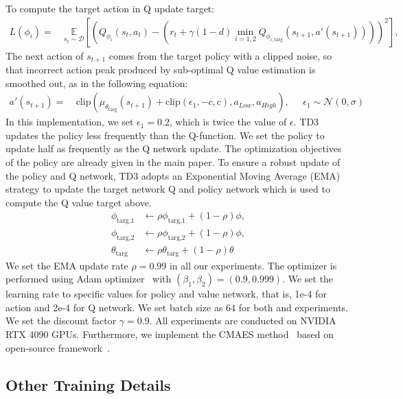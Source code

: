 To compute the target action in Q update target:
\begin{align}\label{eq:qloss1}
L(\phi_{i}) = & ~ \underset{s_t \sim {\mathcal D}}{\mathbb{E}}  \left[ \left( Q_{\phi_i}(s_t,a_t) - \left( r_t + \gamma (1-d) \min_{i=1,2} Q_{\phi_{i, \text{targ}}}(s_{t+1}, a'(s_{t+1}))  \right) \right)^2\right] ,
\end{align}
The next action of $s_{t+1}$ comes from the target policy with a clipped noise, so that incorrect action peak produced by sub-optimal Q value estimation is smoothed out, as in the following equation:
\begin{align}
a'(s_{t+1}) = &~ \text{clip}\left(\mu_{\theta_{\text{targ}}}(s_{t+1}) + \text{clip}(\epsilon_1,-c,c), a_{Low}, a_{High}\right), \;\;\;\;\; \epsilon_1 \sim \mathcal{N}(0, \sigma) 
\end{align}
In this implementation, we set $\epsilon_1 = 0.2$, which is twice the value of $\epsilon$. 
TD3 updates the policy less frequently than the Q-function. We set the policy to update half as frequently as the Q network update. The optimization objectives of the policy are already given in the main paper. To ensure a robust update of the policy and Q network, TD3 adopts an Exponential Moving Average (EMA) strategy to update the target network Q and policy network which is used to compute the Q value target above. 
\begin{align}
\phi_{\text{targ,1}} & \leftarrow \rho \phi_{\text{targ,1}} + (1 - \rho) \phi, \\
\phi_{\text{targ,2}} & \leftarrow \rho \phi_{\text{targ,2}} + (1 - \rho) \phi, \\
\theta_{\text{targ}} & \leftarrow \rho \theta_{\text{targ}} + (1 - \rho) \theta
\end{align}
We set the EMA update rate $\rho = 0.99$ in all our experiments. 
The optimizer is performed using Adam optimizer~\cite{kingma2014adam}  with $(\beta_1, \beta_2) = (0.9, 0.999)$. We set the learning rate to specific values for policy and value network, that is, 1e-4 for action and 2e-4 for Q network. We set batch size as 64 for both \taskPFT and \taskPST experiments. We set the discount factor $\gamma = 0.9$.
All experiments are conducted on NVIDIA RTX 4090 GPUs.
Furthermore, we implement the CMAES method~\cite{tseng2019hyperparameter} based on open-source framework~\cite{pymoo}.



\subsection{Other Training Details}

